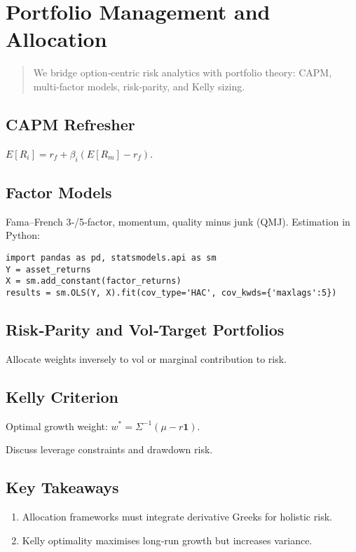 \chapter{Portfolio Management and Allocation}\label{ch:portfolio}

\begin{abstract}
We bridge option‑centric risk analytics with portfolio theory:
CAPM, multi‑factor models, risk‑parity, and Kelly sizing.
\end{abstract}

\section{CAPM Refresher}

\(E[R_i] = r_f + \beta_i(E[R_m]-r_f)\).

\section{Factor Models}

Fama–French 3‑/5‑factor, momentum, quality minus junk (QMJ).
Estimation in Python:

\begin{verbatim}
import pandas as pd, statsmodels.api as sm
Y = asset_returns
X = sm.add_constant(factor_returns)
results = sm.OLS(Y, X).fit(cov_type='HAC', cov_kwds={'maxlags':5})
\end{verbatim}

\section{Risk‑Parity and Vol‑Target Portfolios}

Allocate weights inversely to vol or marginal contribution to risk.

\section{Kelly Criterion}

Optimal growth weight:
\(w^* = \Sigma^{-1}(\mu - r\mathbf 1)\).

Discuss leverage constraints and drawdown risk.

\section*{Key Takeaways}
\begin{enumerate}
  \item Allocation frameworks must integrate derivative Greeks for holistic risk.
  \item Kelly optimality maximises long‑run growth but increases variance.
\end{enumerate}
